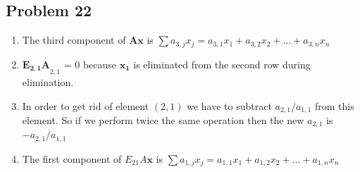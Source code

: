 \documentclass[a4paper,11pt]{article}
\newcommand{\mybf}[1]{\boldsymbol{#1}}
\begin{document}
\subsection*{Problem 22}
\begin{enumerate}[label=\alph*]
\item The third component of $\mybf{Ax}$ is $\sum a_{3,j}x_j = a_{3,1}x_1+a_{3,2}x_2+\dots+a_{3,n}x_n$
\item $\mybf{E_{2,1}A}_{2,1}$ = 0 because $\mybf{x_1}$ is eliminated from the second row during elimination.
\item In order to get rid of element $(2,1)$ we have to subtract $a_{2,1}/a_{1,1}$ from this element. So if we perform twice the same operation then the new $a_{2,1}$ is $-a_{2,1}/a_{1,1}$
\item The first component of $E_{21}A\mybf{x}$ is $\sum a_{1,j}x_j = a_{1,1}x_1+a_{1,2}x_2+\dots+a_{1,n}x_n$
\end{enumerate}
\end{document}
